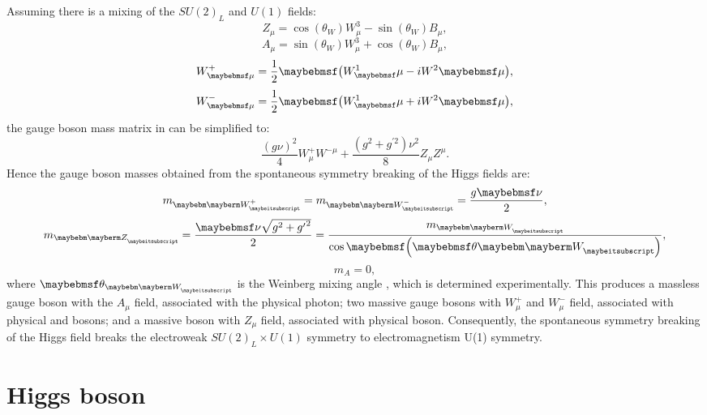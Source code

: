 Assuming there is a mixing of the $SU(2)_L$ and $U(1)$ fields:
\begin{equation}
Z_{\mu} = \cos\left(\theta_W\right)W^3_{\mu} - \sin\left(\theta_W\right)B_{\mu},
\end{equation}
\begin{equation}
A_{\mu} = \sin\left(\theta_W\right)W^3_{\mu} + \cos\left(\theta_W\right)B_{\mu},
\end{equation}
\begin{equation}
W^+_{\mu} = \frac{1}{2}\parenths{W^1_\mu-iW^2\mu},
\end{equation}
\begin{equation}
W^-_{\mu} = \frac{1}{2}\parenths{W^1_\mu+iW^2\mu},
\end{equation}
the gauge boson mass matrix in  can be simplified to:
\begin{equation}
\frac{{\left(g\nu\right)}^2}{4}W^+_{\mu}W^{-\mu} + \frac{\left(g^2 + g^{'2}\right)\nu^2}{8}Z_{\mu}Z^{\mu}.
\label{eq:theoryBoson}
\end{equation}
Hence the gauge boson masses obtained from the spontaneous symmetry breaking of the Higgs fields are:
\begin{equation}
m_{\PWplus} = m_{\PWminus} = \frac{g\nu}{2},
\end{equation}
\begin{equation}
m_{\PZ} = \frac{\nu\sqrt{g^2+{g'}^2}}{2} = \frac{m_{\PW}}{\cos\parenths{\theta{\PW}}},
\end{equation}
\begin{equation}
m_{A} = 0,
\end{equation}
where $\theta_{\PW}$ is the Weinberg mixing angle \cite{Weinberg:1967tq}, which is determined experimentally. This produces  a massless gauge boson with the $A_\mu$ field, associated with the physical photon; two massive  gauge bosons with $W^+_{\mu}$ and $W^-_{\mu}$ field, associated with physical \PWplus and \PWminus bosons; and a massive boson with $Z_{\mu}$ field, associated with physical \PZ boson. Consequently, the spontaneous symmetry breaking of the Higgs field breaks the electroweak  $SU(2)_L\times U(1)$ symmetry to electromagnetism U(1) symmetry.


\section{Higgs boson}
\label{sec:theoryHiggsBoson}


